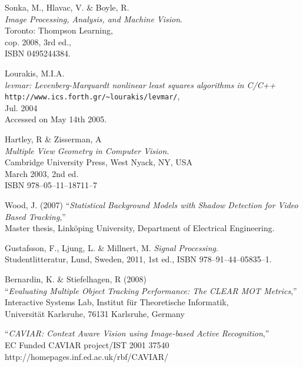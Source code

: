 \begin{thebibliography}{9}

	Sonka, M., Hlavac, V. \& Boyle, R. \\
	\emph{Image Processing, Analysis, and Machine Vision}.\\
	Toronto: Thompson Learning,\\
	cop. 2008, 3rd ed.,\\
	ISBN 0495244384.

    Lourakis, M.I.A.\\
   \emph{levmar: Levenberg-Marquardt nonlinear least squares algorithms in {C}/{C}++}\\
     \verb+http://www.ics.forth.gr/~lourakis/levmar/+,\\
    Jul. 2004\\
    Accessed on May 14th 2005.

	Hartley, R \& Zisserman, A\\
	\emph{Multiple View Geometry in Computer Vision}.\\
	Cambridge University Press, West Nyack, NY, USA \\
	March 2003, 2nd ed.\\
	ISBN 978--05--11--18711--7
	
	
	
	Wood, J. (2007)
	``\textit{Statistical Background Models with Shadow Detection for Video Based Tracking},''\\
	Master thesis, Linköping University, Department of Electrical Engineering.	


	
	Gustafsson, F., Ljung, L. \& Millnert, M.
	\emph{Signal Processing}.\\
	Studentlitteratur, Lund, Sweden,
	2011, 1st ed.,
	ISBN 978--91--44--05835--1.

	Bernardin, K. \& Stiefelhagen, R (2008)\\
	``\textit{Evaluating Multiple Object Tracking Performance: The CLEAR MOT Metrics},''\\
	Interactive Systems Lab, Institut für Theoretische Informatik,\\
	Universität Karlsruhe, 76131 Karlsruhe, Germany

	``\textit{CAVIAR: Context Aware Vision using Image-based Active Recognition},''\\
	EC Funded CAVIAR project/IST 2001 37540\\
	http://homepages.inf.ed.ac.uk/rbf/CAVIAR/
	


\end{thebibliography}